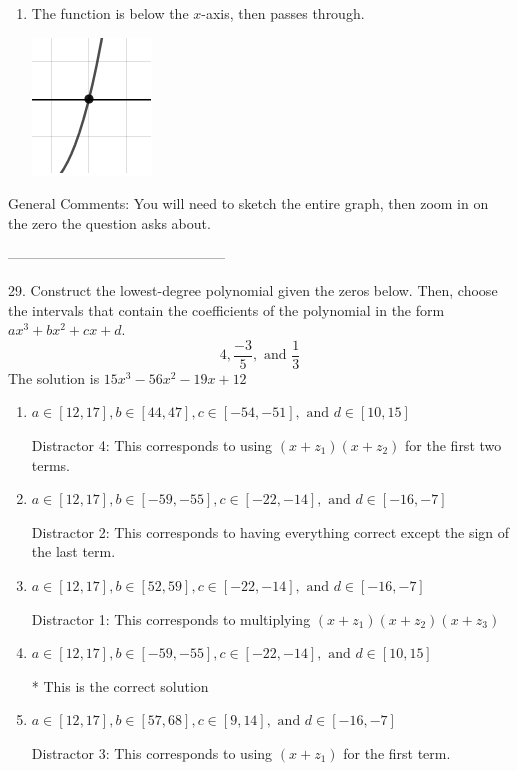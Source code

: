 \documentclass{article}[10pt]
\begin{document}
\begin{enumerate}[label=\Alph*.]
\item The function is below the $x$-axis, then passes through. 
\begin{center}\includegraphics[scale=0.5]{../Figures/zeroBehaviorPositiveOdd.png}\end{center} 
 
\end{enumerate} 
 
General Comments: You will need to sketch the entire graph, then zoom in on the zero the question asks about.

-----------------------------------------------

29. Construct the lowest-degree polynomial given the zeros below. Then, choose the intervals that contain the coefficients of the polynomial in the form $ax^3+bx^2+cx+d$.
$$ 4, \frac{-3}{5}, \text{ and } \frac{1}{3} $$ 
The solution is $ 15 x^3 - 56 x^2 - 19 x + 12 $ 

\begin{enumerate}[label=\Alph*.] 
\item $ a \in [12, 17], b \in [44, 47], c \in [-54, -51], \text{ and } d \in [10, 15] $ 

  Distractor 4: This corresponds to using $(x+z_1)(x+z_2)$ for the first two terms. 
\item $ a \in [12, 17], b \in [-59, -55], c \in [-22, -14], \text{ and } d \in [-16, -7] $ 

  Distractor 2: This corresponds to having everything correct except the sign of the last term. 
\item $ a \in [12, 17], b \in [52, 59], c \in [-22, -14], \text{ and } d \in [-16, -7] $ 

  Distractor 1: This corresponds to multiplying $(x+z_1)(x+z_2)(x+z_3)$ 
\item $ a \in [12, 17], b \in [-59, -55], c \in [-22, -14], \text{ and } d \in [10, 15] $ 

 * This is the correct solution 
\item $ a \in [12, 17], b \in [57, 68], c \in [9, 14], \text{ and } d \in [-16, -7] $ 

  Distractor 3: This corresponds to using $(x+z_1)$ for the first term. 
\end{enumerate} 
 
\end{document}
